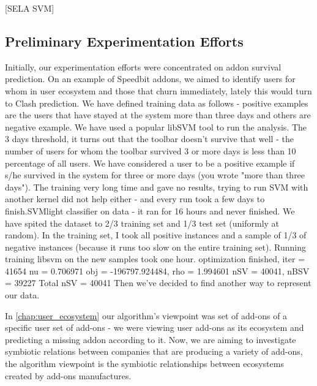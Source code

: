 \documentclass[11pt,oneside]{book}
\let\Oldsubsection\subsection
\renewcommand{\subsection}{\FloatBarrier\Oldsubsection}
\begin{document}
{{{{
[SELA SVM]
\subsection{Preliminary Experimentation Efforts}
Initially, our experimentation efforts were concentrated on addon survival prediction. On an example of Speedbit addons, we aimed to identify users for whom  in user ecosystem and those that churn immediately, lately this would turn to Clash prediction.
We have defined training data as follows - positive examples are the users that have stayed at the system more than three days and others are negative example. We have used a popular libSVM tool to run the analysis.
The 3 days threshold, it turns out that the toolbar doesn't survive that well - the number of users for whom the toolbar survived 3 or more days is less than 10 percentage of all users.
We have considered a user to be a positive example if s/he survived in the system for three or more days (you wrote "more than three days").
The training very long time and gave no results, trying to run SVM with another kernel did not help either - and every run took a few days to finish.SVMlight classifier on data - it ran for 16 hours and never finished.
We have spited the dataset to 2/3 training set and 1/3 test set (uniformly at random). In the training set, I took all positive instances and a sample of 1/3 of negative instances (because it runs too slow on the entire training set).
Running training libsvm on the new samples took one hour.
optimization finished, iter = 41654
nu = 0.706971
obj = -196797.924484, rho = 1.994601
nSV = 40041, nBSV = 39227
Total nSV = 40041
Then we've decided to find another way to represent our data.

In \autoref{chap:user_ecosystem} our algorithm's viewpoint was set of add-ons of a specific user set of add-ons - we were viewing user add-ons as its ecosystem and predicting a missing addon according to it. Now, we are aiming to investigate symbiotic relations between companies that are producing a variety of add-ons, the algorithm viewpoint is the symbiotic relationships between ecosystems created by add-ons manufactures.
}}}}
\end{document}
